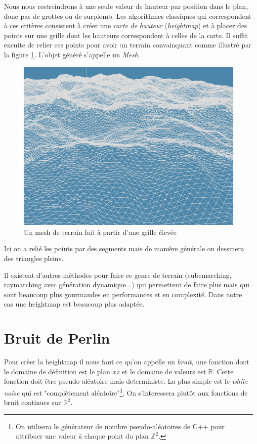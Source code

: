 \documentclass{EPUProjetDi}
\begin{document}
Nous nous restreindrons à une seule valeur de hauteur par position dans le plan, donc pas de grottes ou de surplomb. Les algorithmes classiques qui correspondent à ces critères consistent à créer une \textit{carte de hauteur} (\textit{heightmap}) et à placer des points sur une grille dont les hauteurs correspondent à celles de la carte. Il suffit ensuite de relier ces points pour avoir un terrain convainquant comme illustré par la figure \ref{fig:wireframe_terrain}. L'objet généré s'appelle un \textit{Mesh}.

\begin{figure}[ht]
	\centering
	\includegraphics[scale=.49]{terrain_wireframe}
	\caption{Un mesh de terrain fait à partir d'une grille élevée}
	\label{fig:wireframe_terrain}
\end{figure}

Ici on a relié les points par des segments mais de manière générale on dessinera des triangles pleins.

Il existent d'autres méthodes pour faire ce genre de terrain (cubemarching, raymarching avec génération dynamique...) qui permettent de faire plus mais qui sont beaucoup plus gourmandes en performances et en complexité. Dans notre cas une heightmap est beaucoup plus adaptée.

\section{Bruit de Perlin}

Pour créer la heightmap il nous faut ce qu'on appelle un \textit{bruit}, une fonction dont le domaine de définition est le plan $xz$ et le domaine de valeurs est $\mathbb{R}$. Cette fonction doit être pseudo-aléatoire mais deterministe. La plus simple est le \textit{white noise} qui est "complètement aléatoire"\footnote{On utilisera le générateur de nombre pseudo-aléatoires de C++ pour attribuer une valeur à chaque point du plan $\mathbb{Z}^2$.}. On s'interessera plutôt aux fonctions de bruit continues sur $\mathbb{R}^2$.
\end{document}
